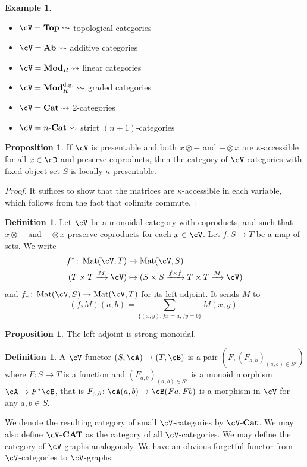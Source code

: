 \documentclass[a4paper,11pt,oneside,openany]{scrbook}
\newcommand{\catname}[1]{{\normalfont\textbf{#1}}}
\newcommand{\Top}{\catname{Top}}
\newcommand{\Ab}{\catname{Ab}}
\newcommand{\Mod}{\catname{Mod}}
\newcommand{\Cat}{\catname{Cat}}
\newcommand{\CAT}{\catname{CAT}}
\newcommand{\from}{\colon}
\DeclareMathOperator{\Mat}{Mat}
\theoremstyle{definition}
\theoremstyle{definition}
\newtheorem{defn}[thm]{Definition} %
\newtheorem{prop}[thm]{Proposition}
\newtheorem{exmp}[thm]{Example}
\begin{document}
\begin{exmp}
    \begin{itemize}
    \item $\cV= \Top \leadsto $ topological categories
    \item $\cV= \Ab \leadsto $ additive categories
    \item $\cV= \Mod_R \leadsto $ linear categories
    \item $\cV= \Mod_R^{\text{d.g.}} \leadsto $ graded categories
    \item $\cV= \Cat \leadsto $ 2-categories
    \item $\cV= n\text{-}\Cat \leadsto $ strict $ (n+1) $-categories
    \end{itemize}
\end{exmp}
\begin{prop}
    If $\cV$ is presentable and both $ x\otimes - $ and $ - \otimes x $ are $ \kappa $-accessible for all $ x\in \cD $ and preserve coproducts, then the category of $\cV$-categories with fixed object set $ S $ is locally $ \kappa $-presentable.
\end{prop}
\begin{proof}
    It suffices to show that the matrices are $ \kappa $-accessible in each variable, which follows from the fact that colimits commute.
\end{proof}
\begin{defn}
    Let $\cV$ be a monoidal category with coproducts, and such that $
    x\otimes - $ and $ - \otimes x $ preserve coproducts for each $ x \in\cV$.
    Let $ f \from S \to T $ be a map of sets.
    We write
    \begin{align*}
    f^* \from \Mat(\cV ,T) & \to \Mat(\cV, S) \\
    ( T\times T \xrightarrow{M}\cV) & \mapsto ( S\times S \xrightarrow{f \times  f} T\times T \xrightarrow{M}\cV)
    \end{align*}
    and $ f_* \from \Mat(\cV,S)\to \Mat(\cV,T) $ for its left adjoint.
    It sends $ M $ to 
    \begin{displaymath}
        (f_* M)(a,b) = \sum_{\{(x,y)\colon fx = a, fy = b \} }M(x,y).
    \end{displaymath}
\end{defn}
\begin{prop}
    The left adjoint is strong monoidal.
\end{prop}
\begin{defn}
    A $\cV$-functor $ (S,\cA) \to (T,\cB) $ is a pair
    $ (F, (F_{a,b})_{(a,b) \in S^2}) $ where $ F\from S \to T $ is a function and $ (F_{a,b})_{(a,b) \in S^2} $ is a monoid morphism $ \cA \to F^*\cB $, that is $ F_{a,b}\from \cA (a,b) \to \cB (Fa,Fb) $ is a morphism in $\cV$ for any $ a,b \in S $.

    We denote the resulting category of small $\cV$-categories by $\cV$-$ \Cat $. We may also define $\cV$-$ \CAT $ as the category of all $\cV$-categories.
    We may define the category of $\cV$-graphs analogously. We have an
    obvious forgetful functor from $\cV$-categories to $\cV$-graphs.
\end{defn}
\end{document}
